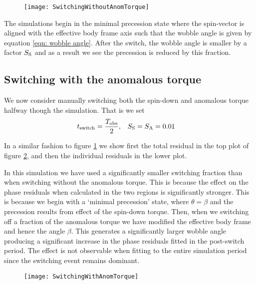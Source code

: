 \documentclass[../full_thesis/full_thesis.tex]{subfiles}
\begin{document}
\begin{figure}[htb]
\texttt{[image: SwitchingWithoutAnomTorque]}
\caption{}
\label{fig: switching without anom}
\end{figure}

The simulations begin in the minimal precession state where the spin-vector
is aligned with the effective body frame axis such that the wobble angle is given
by equation \eqref{eqn: wobble angle}. After the switch, the wobble
angle is smaller by a factor $S_{\mathrm{S}}$ and as a result we see the precession is
reduced by this fraction.


\subsection{Switching with the anomalous torque}
We now consider manually switching both the spin-down and anomalous torque
halfway though the simulation.  That is we set
\begin{align}
    t_{\mathrm{switch}} = \frac{T_{\textrm{obs}}}{2}, &&& S_{\mathrm{S}} = S_{\mathrm{A}} = 0.01
\end{align}

In a similar fashion to figure \ref{fig: switching without anom} we show first
the total residual in the top plot of figure \ref{fig: switching with anom}, and
then the individual residuals in the lower plot.

In this simulation we have used a significantly smaller switching fraction 
than when switching without the anomalous torque. This is because the effect 
on the phase residuals when calculated in the two regions is significantly
stronger. This is because we begin with a `minimal precession' state, where
$\theta = \beta$ and the precession results from effect of the spin-down torque.
Then, when we switching off a fraction of the anomalous torque we have modified
the effective body frame and hence the angle $\beta$. This generates a significantly
larger wobble angle producing a significant increase in the phase residuals
fitted in the post-switch period. The effect is not observable when fitting
to the entire simulation period since the switching event remains dominant.

\begin{figure}[htb]
\texttt{[image: SwitchingWithAnomTorque]}
\caption{}
\label{fig: switching with anom}
\end{figure}
\end{document}
